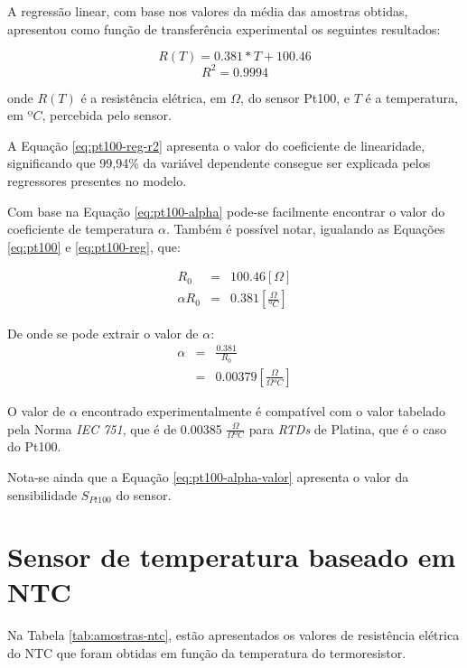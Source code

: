 \documentclass[a4paper]{instrumentacao}
\begin{document}
A regressão linear, com base nos valores da média das amostras obtidas, apresentou como função de transferência experimental os seguintes resultados:

\begin{equation}
	R(T) = 0.381*T + 100.46
	\label{eq:pt100-reg}
\end{equation}
\begin{equation}
	R^2=0.9994
	\label{eq:pt100-reg-r2}
\end{equation}

\noindent
onde $R(T)$ é a resistência elétrica, em $\Omega$, do sensor Pt100, e $T$ é a temperatura, em $ºC$, percebida pelo sensor.

A Equação \ref{eq:pt100-reg-r2} apresenta o valor do coeficiente de linearidade, significando que 99,94\% da variável dependente consegue ser explicada pelos regressores presentes no modelo.

Com base na Equação \ref{eq:pt100-alpha} pode-se facilmente encontrar o valor do coeficiente de temperatura $\alpha$. Também é possível notar, igualando as Equações \ref{eq:pt100} e \ref{eq:pt100-reg}, que:

\begin{eqnarray}
	R_0 &=& 100.46 [\Omega]\\
	\alpha R_0 &=& 0.381 [\frac{\Omega}{ºC}] \label{eq:pt100-alpha-valor}
\end{eqnarray}

De onde se pode extrair o valor de $\alpha$:
\begin{eqnarray}
	\alpha &=& \frac{0.381}{R_0} \\
	       &=& 0.00379 [\frac{\Omega}{\Omega ºC}]
\end{eqnarray}

O valor de $\alpha$ encontrado experimentalmente é compatível com o valor tabelado pela Norma \textit{IEC 751}, que é de 0.00385 $\frac{\Omega}{\Omega ºC}$ para \textit{RTDs} de Platina, que é o caso do Pt100.

Nota-se ainda que a Equação \ref{eq:pt100-alpha-valor} apresenta o valor da sensibilidade $S_{Pt100}$ do sensor.


\section{Sensor de temperatura baseado em NTC}

Na Tabela \ref{tab:amostras-ntc}, estão apresentados os valores de resistência elétrica do NTC que foram obtidas em função da temperatura do termoresistor.
\end{document}
